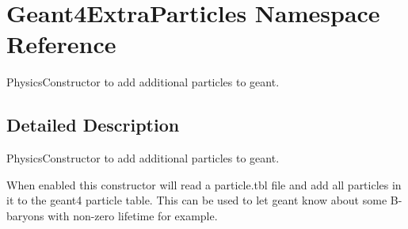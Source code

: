 \hypertarget{namespace_geant4_extra_particles}{}\section{Geant4\+Extra\+Particles Namespace Reference}
\label{namespace_geant4_extra_particles}


Physics\+Constructor to add additional particles to geant.  




\subsection{Detailed Description}
Physics\+Constructor to add additional particles to geant. 

When enabled this constructor will read a particle.\+tbl file and add all particles in it to the geant4 particle table. This can be used to let geant know about some B-\/baryons with non-\/zero lifetime for example. 
